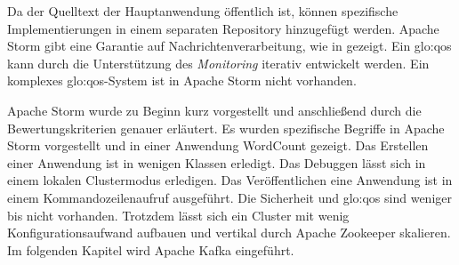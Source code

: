 Da der Quelltext der Hauptanwendung öffentlich ist, können spezifische Implementierungen in einem separaten Repository hinzugefügt werden. Apache Storm gibt eine Garantie auf Nachrichtenverarbeitung, wie in  gezeigt. Ein \gls{glo:qos} kann durch die Unterstützung des \textit{Monitoring} iterativ entwickelt werden. Ein komplexes \gls{glo:qos}-System ist in Apache Storm nicht vorhanden.

Apache Storm wurde zu Beginn kurz vorgestellt und anschließend durch die Bewertungskriterien genauer erläutert. Es wurden spezifische Begriffe in Apache Storm vorgestellt und in einer Anwendung WordCount gezeigt. Das Erstellen einer Anwendung ist in wenigen Klassen erledigt. Das Debuggen lässt sich in einem lokalen Clustermodus erledigen. Das Veröffentlichen eine Anwendung ist in einem Kommandozeilenaufruf ausgeführt. Die Sicherheit und \gls{glo:qos} sind weniger bis nicht vorhanden. Trotzdem lässt sich ein Cluster mit wenig Konfigurationsaufwand aufbauen und vertikal durch Apache Zookeeper skalieren. Im folgenden Kapitel wird Apache Kafka eingeführt.

